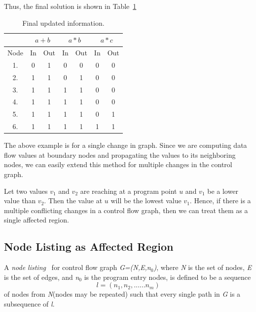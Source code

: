 \documentclass[11pt,a4paper,openright]{report}
\begin{document}
Thus, the final solution is shown in Table~\ref{tab:Available_exp_final_solution}

\begin{table}[H]
  \begin{center}
    \begin{tabular}{c c c c c c c }
    \hline
       & \multicolumn{2}{c}{$a+b$} & \multicolumn{2}{c}{$a*b$} & \multicolumn{2}{c}{$a*c$} \\
    \hline
      Node & In & Out & In & Out & In & Out\\
   	\midrule
   	  1. & 0 & 1 &0 & 0 & 0 & 0 \\
   	  2. & 1 & 1 & 0 & 1 & 0 & 0  \\
   	  3. & 1 & 1 & 1 & 1 & 0 & 0 \\
   	  4. & 1 & 1 & 1 & 1 & 0 & 0 \\
   	  5. & 1 & 1 & 1 & 1& 0 & 1 \\
   	  6. & 1 & 1 & 1 & 1 & 1 & 1\\
      
      \bottomrule 
    \end{tabular}
    \caption{Final updated information.}
      \label{tab:Available_exp_final_solution}
  \end{center}
\end{table}

The above example is for a single change in graph. Since we are computing data flow values at boundary nodes and propagating the values to its neighboring nodes, we can
easily extend this method for multiple changes in the control graph.

Let two values $v_1$ and $v_2$ are reaching at a program point $u$ and $v_1$ be a lower value than $v_2$. Then the value at $u$ will be the lowest value $v_1$.
Hence, if there is a multiple conflicting changes in a control flow graph, then we can treat them as a single affected region. 


\subsection{Node Listing as Affected Region}
A \textit{node listing}~\cite{node_listing} for control flow graph \textit{G=(N,E,n$_0$)}, where \textit{N} is the set of nodes, \textit{E} is the set of edges, and \textit{n$_0$} is the
program entry nodes, is defined to be a sequence 
\begin{equation}
 l=(n_1, n_2, ......n_m)
\end{equation}
of nodes from \textit{N}(nodes may be repeated) such that every single path in \textit{G} is a subsequence of \textit{l}. 
\end{document}
